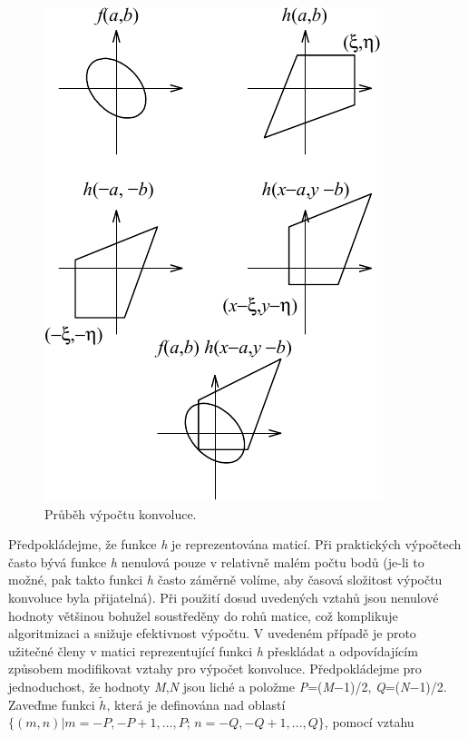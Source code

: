 \begin{figure}[th]
    \begin{center}
        \includegraphics[scale=1.0]{01_signaly/images/img_1_1.pdf}
    \end{center}
    \caption{Průběh výpočtu konvoluce.}
    \label{img:1_1}
\end{figure}

Předpokládejme, že funkce \textit{h} je reprezentována maticí. Při praktických výpočtech často bývá funkce \textit{h} nenulová pouze v relativně malém počtu bodů (je-li to možné, pak takto funkci \textit{h} často záměrně volíme, aby časová složitost výpočtu konvoluce byla přijatelná). Při použití dosud uvedených vztahů jsou nenulové hodnoty většinou bohužel soustředěny do rohů matice, což komplikuje algoritmizaci a snižuje efektivnost výpočtu. V uvedeném případě je proto užitečné členy v matici reprezentující funkci \textit{h} přeskládat a odpovídajícím způsobem modifikovat vztahy pro výpočet konvoluce. Předpokládejme pro jednoduchost, že hodnoty \textit{M},\textit{N} jsou liché a položme \textit{P}=(\textit{M}$-$1)/2, \textit{Q}=(\textit{N}$-$1)/2. Zaveďme funkci $\tilde{h}$, která je definována nad oblastí $\{(m, n) | m = -P, -P+1, \dots, P$; $n = -Q, -Q+1, \dots, Q\}$, pomocí vztahu

